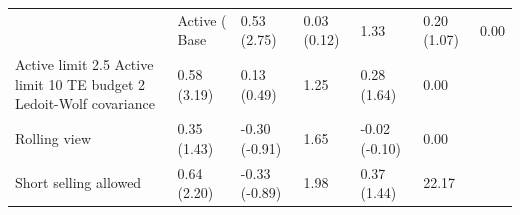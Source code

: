 \begin{tabular}{llllll}
\toprule
 & Active (%
\midrule
Base & 0.53 (2.75) & 0.03 (0.12) & 1.33 & 0.20 (1.07) & 0.00 \\
Active limit 2.5%
Active limit 10%
TE budget 2%
Ledoit-Wolf covariance & 0.58 (3.19) & 0.13 (0.49) & 1.25 & 0.28 (1.64) & 0.00 \\
Rolling view & 0.35 (1.43) & -0.30 (-0.91) & 1.65 & -0.02 (-0.10) & 0.00 \\
Short selling allowed & 0.64 (2.20) & -0.33 (-0.89) & 1.98 & 0.37 (1.44) & 22.17 \\
\bottomrule
\end{tabular}
